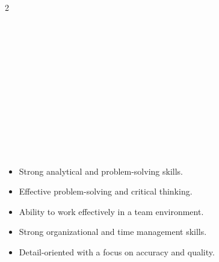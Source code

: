 \documentclass[11pt,a3paper,ragged2e,withhyper]{altacv}
\begin{document}
\begin{paracol}{2}

\\
\\




\\

\\
\\
\\



\\
\\
\\
\\

\begin{itemize}
  \item Strong analytical and problem-solving skills.
  \item Effective problem-solving and critical thinking.
  \item Ability to work effectively in a team environment.
  \item Strong organizational and time management skills.
  \item Detail-oriented with a focus on accuracy and quality.
\end{itemize}













\end{paracol}
\end{document}
